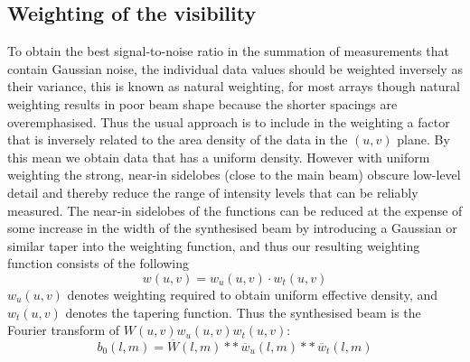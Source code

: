\subsection{Weighting of the visibility}
To obtain the best signal-to-noise ratio in the summation of measurements that contain Gaussian noise, the individual data values should be weighted inversely as their variance, this is known as natural weighting, for most arrays though natural weighting results in poor beam shape because the shorter spacings are overemphasised. Thus the usual approach is to include in the weighting a factor that is inversely related to the area density of the data in the $(u,v)$ plane. By this mean we obtain data that has a uniform density. However with uniform weighting the strong, near-in sidelobes (close to the main beam) obscure low-level detail and thereby reduce the range of intensity levels that can be reliably measured. The near-in sidelobes of the functions can be reduced at the expense of some increase in the width of the synthesised beam by introducing a Gaussian or similar taper into the weighting function, and thus our resulting weighting function consists of the following
\begin{equation}
w(u,v) = w_u(u,v)\cdot{w_t(u,v)}
\end{equation}
$w_u(u,v)$ denotes weighting required to obtain uniform effective density, and ${w_t(u,v)}$ denotes the tapering function.
Thus the synthesised beam is the Fourier transform of $W(u,v)w_u(u,v){w_t(u,v)}$:
\begin{equation}
\label{eq:synthBeam}
b_0(l,m) = \overline{W}(l,m)\ast\ast{\,}\overline{w}_u(l,m)\ast\ast{\,}\overline{w}_t(l,m)
\end{equation}

